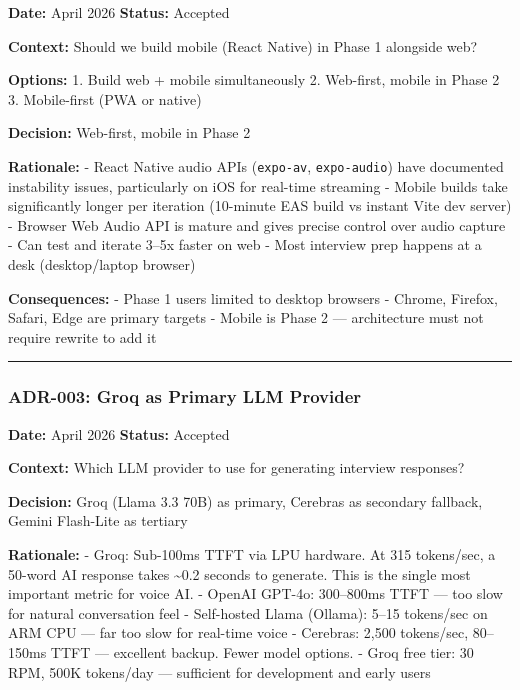 \documentclass[
  11pt,
]{article}
\newcommand{\passthrough}[1]{#1}
\begin{document}
\textbf{Date:} April 2026 \textbar{} \textbf{Status:} Accepted

\textbf{Context:} Should we build mobile (React Native) in Phase 1
alongside web?

\textbf{Options:} 1. Build web + mobile simultaneously 2. Web-first,
mobile in Phase 2 3. Mobile-first (PWA or native)

\textbf{Decision:} Web-first, mobile in Phase 2

\textbf{Rationale:} - React Native audio APIs
(\passthrough{\lstinline!expo-av!},
\passthrough{\lstinline!expo-audio!}) have documented instability
issues, particularly on iOS for real-time streaming - Mobile builds take
significantly longer per iteration (10-minute EAS build vs instant Vite
dev server) - Browser Web Audio API is mature and gives precise control
over audio capture - Can test and iterate 3--5x faster on web - Most
interview prep happens at a desk (desktop/laptop browser)

\textbf{Consequences:} - Phase 1 users limited to desktop browsers -
Chrome, Firefox, Safari, Edge are primary targets - Mobile is Phase 2
--- architecture must not require rewrite to add it

\begin{center}\rule{0.5\linewidth}{0.5pt}\end{center}

\hypertarget{adr-003-groq-as-primary-llm-provider}{%
\subsubsection{ADR-003: Groq as Primary LLM
Provider}\label{adr-003-groq-as-primary-llm-provider}}

\textbf{Date:} April 2026 \textbar{} \textbf{Status:} Accepted

\textbf{Context:} Which LLM provider to use for generating interview
responses?

\textbf{Decision:} Groq (Llama 3.3 70B) as primary, Cerebras as
secondary fallback, Gemini Flash-Lite as tertiary

\textbf{Rationale:} - Groq: Sub-100ms TTFT via LPU hardware. At 315
tokens/sec, a 50-word AI response takes \textasciitilde0.2 seconds to
generate. This is the single most important metric for voice AI. -
OpenAI GPT-4o: 300--800ms TTFT --- too slow for natural conversation
feel - Self-hosted Llama (Ollama): 5--15 tokens/sec on ARM CPU --- far
too slow for real-time voice - Cerebras: 2,500 tokens/sec, 80--150ms
TTFT --- excellent backup. Fewer model options. - Groq free tier: 30
RPM, 500K tokens/day --- sufficient for development and early users
\end{document}
